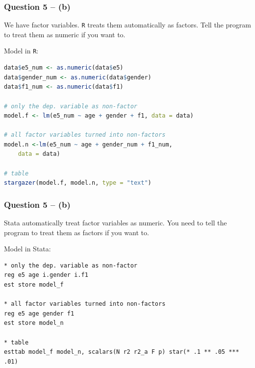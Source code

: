 \documentclass[xcolor=table]{beamer}
\begin{document}
\begin{frame}[fragile]
\frametitle{Question 5 -- (b)}
We have factor variables. \texttt{R} treats them automatically as factors. Tell the program to treat them as numeric if you want to. \pause

Model in \texttt{R}:
\begin{lstlisting}[language = R]
data$e5_num <- as.numeric(data$e5)
data$gender_num <- as.numeric(data$gender)
data$f1_num <- as.numeric(data$f1)

# only the dep. variable as non-factor
model.f <- lm(e5_num ~ age + gender + f1, data = data)

# all factor variables turned into non-factors
model.n <-lm(e5_num ~ age + gender_num + f1_num, 
	data = data)
	
# table
stargazer(model.f, model.n, type = "text")
\end{lstlisting}
\end{frame}

\begin{frame}[fragile]
\frametitle{Question 5 -- (b)}
Stata automatically treat factor variables as numeric. You need to tell the program to treat them as factors if you want to. \pause

Model in Stata:
\begin{lstlisting}
* only the dep. variable as non-factor
reg e5 age i.gender i.f1
est store model_f

* all factor variables turned into non-factors
reg e5 age gender f1
est store model_n

* table
esttab model_f model_n, scalars(N r2 r2_a F p) star(* .1 ** .05 *** .01)
\end{lstlisting}
\end{frame}
\end{document}
